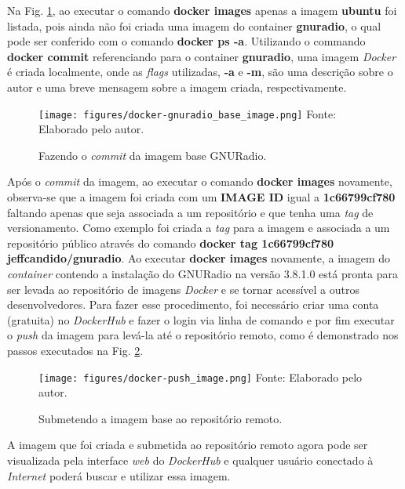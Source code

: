 \documentclass[
  12pt,				%
  openright,			%
  twoside,			%
  a4paper,			%
  english,			%
  french,				%
  spanish,			%
  brazil,				%
  ]{abntex2}
\begin{document}
Na Fig. \ref{fig:docker-gnuradio_base_image}, ao executar o comando \textbf{docker images} apenas a imagem \textbf{ubuntu}
foi listada, pois ainda não foi criada uma imagem do container \textbf{gnuradio}, o qual pode ser conferido com o comando
\textbf{docker ps -a}. Utilizando o commando \textbf{docker commit} referenciando para o container \textbf{gnuradio}, uma imagem
\textit{Docker} é criada localmente, onde as \textit{flags} utilizadas, \textbf{-a} e \textbf{-m}, são uma descrição
sobre o autor e uma breve mensagem sobre a imagem criada, respectivamente.

\begin{figure}[!htb]
  \centering
  \caption{Fazendo o \textit{commit} da imagem base GNURadio.}
  \texttt{[image: figures/docker-gnuradio\_base\_image.png]}
  Fonte: Elaborado pelo autor.
  \label{fig:docker-gnuradio_base_image}
\end{figure}

Após o \textit{commit} da imagem, ao executar o comando \textbf{docker images} novamente, observa-se que a imagem foi criada com
um \textbf{IMAGE ID} igual a \textbf{1c66799cf780} faltando apenas que seja associada a um repositório e que tenha uma \textit{tag} de versionamento.
Como exemplo foi criada a \textit{tag} para a imagem e associada a um repositório público através do comando \textbf{docker tag 1c66799cf780 jeffcandido/gnuradio}.
Ao executar \textbf{docker images} novamente, a imagem do \textit{container} contendo a instalação do GNURadio na versão 3.8.1.0
está pronta para ser levada ao repositório de imagens \textit{Docker} e se tornar acessível a outros desenvolvedores. Para
fazer esse procedimento, foi necessário criar uma conta (gratuita) no \textit{DockerHub} e fazer o login via linha de comando e por fim
executar o \textit{push} da imagem para levá-la até o repositório remoto, como é demonstrado nos passos executados na Fig. \ref{fig:docker-push_image}.

\begin{figure}[!htb]
  \centering
  \caption{Submetendo a imagem base ao repositório remoto.}
  \texttt{[image: figures/docker-push\_image.png]}
  Fonte: Elaborado pelo autor.
  \label{fig:docker-push_image}
\end{figure}

A imagem que foi criada e submetida ao repositório remoto agora pode ser visualizada pela interface \textit{web} do \textit{DockerHub} e qualquer usuário
conectado à \textit{Internet} poderá buscar e utilizar essa imagem.
\end{document}
